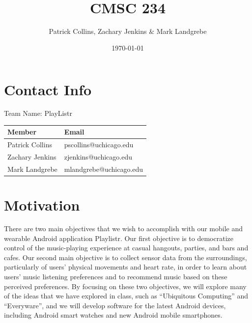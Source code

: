 \documentclass[12pt]{article}
\begin{document}
\title{CMSC 234}
\author{Patrick Collins, Zachary Jenkins \& Mark Landgrebe}
\date{\today}
\maketitle
\pagebreak

\section{Contact Info}
Team Name: PlayListr

\begin{center}
\begin{tabular}{l|l}
 Member           &  Email                    \\ \hline
 Patrick Collins  &  pscollins@uchicago.edu   \\
 Zachary Jenkins  &  zjenkins@uchicago.edu    \\
 Mark Landgrebe   &  mlandgrebe@uchicago.edu  \\
\end{tabular}
\end{center}

\pagebreak

\section{Motivation}

There are two main objectives that we wish to accomplish with our
mobile and wearable Android application Playlistr. Our first objective
is to democratize control of the music-playing experience at casual
hangouts, parties, and bars and cafes. Our second main objective is to
collect sensor data from the surroundings, particularly of users’
physical movements and heart rate, in order to learn about users’
music listening preferences and to recommend music based on these
perceived preferences. By focusing on these two objectives, we will
explore many of the ideas that we have explored in class, such as
“Ubiquitous Computing” and “Everyware”, and we will develop software
for the latest Android devices, including Android smart watches and
new Android mobile smartphones.
\end{document}
